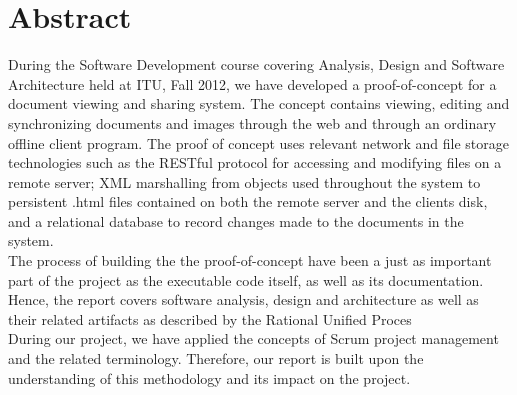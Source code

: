 \section{Abstract}
During the Software Development course covering Analysis, Design and Software Architecture held at ITU, Fall 2012, we have developed a proof-of-concept for a document viewing and sharing system. The concept contains viewing, editing and synchronizing documents and images through the web and through an ordinary offline client program. 
The proof of concept uses relevant network and file storage technologies such as the RESTful protocol for accessing and modifying files on a remote server; XML marshalling from objects used throughout the system to persistent .html files contained on both the remote server and the clients disk, and a relational database to record changes made to the documents in the system.\\
\newline
The process of building the the proof-of-concept have been a just as important part of the project as the executable code itself, as well as its documentation. Hence, the report covers software analysis, design and architecture as well as their related artifacts as described by the Rational Unified Proces \cite[p.~38]{OOAD}\\
\newline
During our project, we have applied the concepts of Scrum project management and the related terminology. Therefore, our report is built upon the understanding of this methodology and its impact on the project.
\newpage